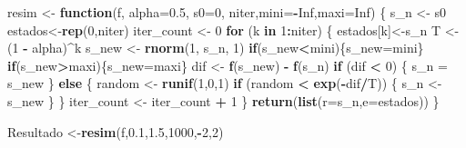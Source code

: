 \documentclass[
]{article}
\newenvironment{Shaded}{\begin{snugshade}}{\end{snugshade}}
\newcommand{\AttributeTok}[1]{\textcolor[rgb]{0.13,0.29,0.53}{#1}}
\newcommand{\ConstantTok}[1]{\textcolor[rgb]{0.56,0.35,0.01}{#1}}
\newcommand{\ControlFlowTok}[1]{\textcolor[rgb]{0.13,0.29,0.53}{\textbf{#1}}}
\newcommand{\DecValTok}[1]{\textcolor[rgb]{0.00,0.00,0.81}{#1}}
\newcommand{\FloatTok}[1]{\textcolor[rgb]{0.00,0.00,0.81}{#1}}
\newcommand{\FunctionTok}[1]{\textcolor[rgb]{0.13,0.29,0.53}{\textbf{#1}}}
\newcommand{\NormalTok}[1]{#1}
\newcommand{\OtherTok}[1]{\textcolor[rgb]{0.56,0.35,0.01}{#1}}
\newcommand{\SpecialCharTok}[1]{\textcolor[rgb]{0.81,0.36,0.00}{\textbf{#1}}}
\begin{document}
\begin{Shaded}
\begin{Highlighting}[]
\NormalTok{resim }\OtherTok{\textless{}{-}} \ControlFlowTok{function}\NormalTok{(f, }\AttributeTok{alpha=}\FloatTok{0.5}\NormalTok{, }\AttributeTok{s0=}\DecValTok{0}\NormalTok{, niter,}\AttributeTok{mini=}\SpecialCharTok{{-}}\ConstantTok{Inf}\NormalTok{,}\AttributeTok{maxi=}\ConstantTok{Inf}\NormalTok{) \{}
\NormalTok{  s\_n }\OtherTok{\textless{}{-}}\NormalTok{ s0}
\NormalTok{  estados}\OtherTok{\textless{}{-}}\FunctionTok{rep}\NormalTok{(}\DecValTok{0}\NormalTok{,niter)}
\NormalTok{  iter\_count }\OtherTok{\textless{}{-}} \DecValTok{0}
  \ControlFlowTok{for}\NormalTok{ (k }\ControlFlowTok{in} \DecValTok{1}\SpecialCharTok{:}\NormalTok{niter) \{}
\NormalTok{    estados[k]}\OtherTok{\textless{}{-}}\NormalTok{s\_n}
\NormalTok{    T }\OtherTok{\textless{}{-}}\NormalTok{ (}\DecValTok{1} \SpecialCharTok{{-}}\NormalTok{ alpha)}\SpecialCharTok{\^{}}\NormalTok{k}
\NormalTok{    s\_new }\OtherTok{\textless{}{-}} \FunctionTok{rnorm}\NormalTok{(}\DecValTok{1}\NormalTok{, s\_n, }\DecValTok{1}\NormalTok{)}
    \ControlFlowTok{if}\NormalTok{(s\_new}\SpecialCharTok{\textless{}}\NormalTok{mini)\{s\_new}\OtherTok{=}\NormalTok{mini\}}
    \ControlFlowTok{if}\NormalTok{(s\_new}\SpecialCharTok{\textgreater{}}\NormalTok{maxi)\{s\_new}\OtherTok{=}\NormalTok{maxi\}}
\NormalTok{    dif }\OtherTok{\textless{}{-}} \FunctionTok{f}\NormalTok{(s\_new) }\SpecialCharTok{{-}} \FunctionTok{f}\NormalTok{(s\_n)}
    \ControlFlowTok{if}\NormalTok{ (dif }\SpecialCharTok{\textless{}} \DecValTok{0}\NormalTok{) \{}
\NormalTok{      s\_n }\OtherTok{=}\NormalTok{ s\_new}
\NormalTok{      \} }\ControlFlowTok{else}\NormalTok{ \{}
\NormalTok{        random }\OtherTok{\textless{}{-}} \FunctionTok{runif}\NormalTok{(}\DecValTok{1}\NormalTok{,}\DecValTok{0}\NormalTok{,}\DecValTok{1}\NormalTok{)}
        \ControlFlowTok{if}\NormalTok{ (random }\SpecialCharTok{\textless{}} \FunctionTok{exp}\NormalTok{(}\SpecialCharTok{{-}}\NormalTok{dif}\SpecialCharTok{/}\NormalTok{T)) \{}
\NormalTok{          s\_n }\OtherTok{\textless{}{-}}\NormalTok{ s\_new}
\NormalTok{        \}}
\NormalTok{        \}}
\NormalTok{    iter\_count }\OtherTok{\textless{}{-}}\NormalTok{ iter\_count }\SpecialCharTok{+} \DecValTok{1}
\NormalTok{    \}}
  \FunctionTok{return}\NormalTok{(}\FunctionTok{list}\NormalTok{(}\AttributeTok{r=}\NormalTok{s\_n,}\AttributeTok{e=}\NormalTok{estados))}
\NormalTok{\}}

\NormalTok{Resultado }\OtherTok{\textless{}{-}}\FunctionTok{resim}\NormalTok{(f,}\FloatTok{0.1}\NormalTok{,}\FloatTok{1.5}\NormalTok{,}\DecValTok{1000}\NormalTok{,}\SpecialCharTok{{-}}\DecValTok{2}\NormalTok{,}\DecValTok{2}\NormalTok{)}
\end{Highlighting}
\end{Shaded}
\end{document}
